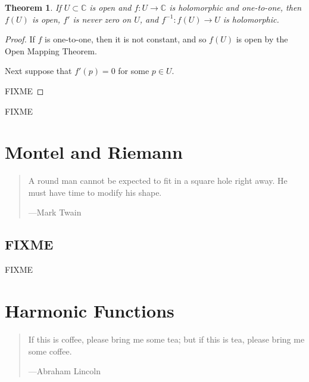 \documentclass[12pt,openany]{book}
\newcommand{\C}{{\mathbb{C}}}
\theoremstyle{plain}
\newtheorem{thm}{Theorem}[section]
\theoremstyle{remark}
\theoremstyle{definition}
\newenvironment{myquote}{%
    \begin{quote}%
    \begingroup\itshape
}{%
    \endgroup%
    \end{quote}
}
\theoremstyle{exercise}
\theoremstyle{example}
\begin{document}
\begin{thm}
If $U \subset \C$ is open and $f \colon U \to \C$ is holomorphic and
one-to-one, then $f(U)$ is open, $f'$ is never zero on $U$, and $f^{-1}
\colon f(U) \to U$ is holomorphic.
\end{thm}

\begin{proof}
If $f$ is one-to-one, then it is not constant, and so $f(U)$ is open by
the Open Mapping Theorem.

Next suppose that $f'(p) = 0$ for some $p \in U$.

FIXME
\end{proof}

FIXME




\chapter{Montel and Riemann} \label{ch:montelriemann}

\begin{myquote}
A round man cannot be expected to fit in a square hole right away. He must
have time to modify his shape.

---Mark Twain
\end{myquote}


\section{FIXME}
\label{sec:FIXME 1}

FIXME


\chapter{Harmonic Functions} \label{ch:harmonic}

\begin{myquote}
If this is coffee, please bring me some tea; but if this is tea, please bring me some coffee.

---Abraham Lincoln
\end{myquote}
\end{document}
